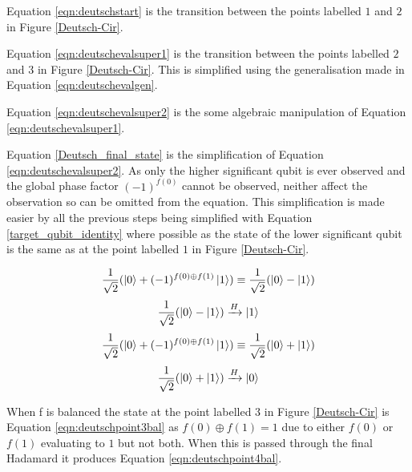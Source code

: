 \begin{list}{}{\topsep=0cm,\itemsep=0cm}
  \item Equation \ref{eqn:deutschstart} is the transition between the points labelled $1$ and $2$ in Figure \ref{Deutsch-Cir}.
  \item Equation \ref{eqn:deutschevalsuper1} is the transition between the points labelled $2$ and $3$ in Figure \ref{Deutsch-Cir}. This is simplified using the generalisation made in Equation \ref{eqn:deutschevalgen}.
  \item Equation \ref{eqn:deutschevalsuper2} is the some algebraic manipulation of Equation \ref{eqn:deutschevalsuper1}.
  \item Equation \ref{Deutsch_final_state} is the simplification of Equation \ref{eqn:deutschevalsuper2}.
As only the higher significant qubit is ever observed and the global phase factor $(-1)^{f(0)}$ cannot be observed, neither affect the observation so can be omitted from the equation.
This simplification is made easier by all the previous steps being simplified with Equation \ref{target_qubit_identity} where possible as the state of the lower significant qubit is the same as at the point labelled $1$ in Figure \ref{Deutsch-Cir}.
\end{list}

\begin{equation}
 \frac{1}{\sqrt{2}}(\left\vert{0}\right\rangle+(-1)^{f(0)\oplus{f(1)}}\left\vert{1}\right\rangle) \equiv \frac{1}{\sqrt{2}}(\left\vert{0}\right\rangle-\left\vert{1}\right\rangle)
\label{eqn:deutschpoint3bal}
\end{equation}
\begin{equation}
 \frac{1}{\sqrt{2}}(\left\vert{0}\right\rangle-\left\vert{1}\right\rangle) \xrightarrow{H} \left\vert{1}\right\rangle
\label{eqn:deutschpoint4bal}
\end{equation}
\begin{equation}
 \frac{1}{\sqrt{2}}(\left\vert{0}\right\rangle+(-1)^{f(0)\oplus{f(1)}}\left\vert{1}\right\rangle) \equiv \frac{1}{\sqrt{2}}(\left\vert{0}\right\rangle+\left\vert{1}\right\rangle)
\label{eqn:deutschpoint3const}
\end{equation}
\begin{equation}
 \frac{1}{\sqrt{2}}(\left\vert{0}\right\rangle+\left\vert{1}\right\rangle) \xrightarrow{H} \left\vert{0}\right\rangle
\label{eqn:deutschpoint4const}
\end{equation}

When f is balanced the state at the point labelled $3$ in Figure \ref{Deutsch-Cir} is Equation \ref{eqn:deutschpoint3bal} as $f(0) \oplus f(1) = 1$ due to either $f(0)$ or $f(1)$ evaluating to $1$ but not both.
When this is passed through the final Hadamard it produces Equation \ref{eqn:deutschpoint4bal}.

